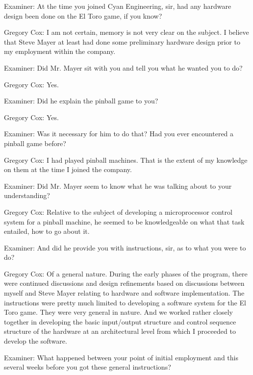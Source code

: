 \textcolor{interviewer}{Examiner:} At the time you joined Cyan Engineering, sir, had any hardware design been done on the El Toro game, if you know? 

\textcolor{interviewee}{Gregory Cox:} I am not certain, memory is not very clear on the subject.  I believe that Steve Mayer at least had done some preliminary hardware design prior to my employment within the company. 

\textcolor{interviewer}{Examiner:} Did Mr. Mayer sit with you and tell you what he wanted you to do? 

\textcolor{interviewee}{Gregory Cox:} Yes.

\textcolor{interviewer}{Examiner:} Did he explain the pinball game to you? 

\textcolor{interviewee}{Gregory Cox:} Yes. 

\textcolor{interviewer}{Examiner:} Was it necessary for him to do that? Had you ever encountered a pinball game before? 

\textcolor{interviewee}{Gregory Cox:} I had played pinball machines. That is the extent of my knowledge on them at the time I joined the company. 

\textcolor{interviewer}{Examiner:} Did Mr. Mayer seem to know what he was talking about to your understanding? 

\textcolor{interviewee}{Gregory Cox:} Relative to the subject of developing a microprocessor control system for a pinball machine, he seemed to be knowledgeable on what that task entailed, how to go about it. 

\textcolor{interviewer}{Examiner:} And did he provide you with instructions, sir, as to what you were to do? 

\textcolor{interviewee}{Gregory Cox:} Of a general nature. During the early phases of the program, there were continued discussions and design refinements based on discussions between myself and Steve Mayer relating to hardware and software implementation. The instructions were pretty much limited to developing a software system for the El Toro game. They were very general in nature. And we worked rather closely together in developing the basic input/output structure and control sequence structure of the hardware at an architectural level from which I proceeded to develop the software. 

\textcolor{interviewer}{Examiner:} What happened between your point of initial employment and this several weeks before you got these general instructions? 

